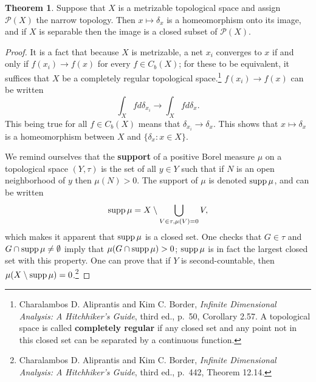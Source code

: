 \documentclass{article}
\newcommand{\supp}{\ensuremath\mathrm{supp}\,}
\theoremstyle{definition}
\newtheorem{theorem}{Theorem}
\theoremstyle{definition}
\begin{document}
\begin{theorem}
Suppose that $X$ is a metrizable topological space and assign $\mathscr{P}(X)$ the narrow topology.
Then $x \mapsto \delta_x$ is a homeomorphism onto its image, and if $X$ is separable then
the image is a closed subset of $\mathscr{P}(X)$.
\label{deltaembedding}
\end{theorem}
\begin{proof}
It is a fact that because $X$ is metrizable,
a net $x_i$ converges to $x$ if and only if $f(x_i) \to f(x)$ for every $f \in C_b(X)$; for these to be equivalent, it suffices that $X$ be a
completely
regular topological space.\footnote{Charalambos D. 
Aliprantis and Kim C. Border, {\em Infinite Dimensional Analysis: A Hitchhiker's Guide}, third ed., p.~50, Corollary 2.57. A topological space is called
\textbf{completely regular} if any closed set and any point not in this closed set can be separated by a continuous function.}
 $f(x_i) \to f(x)$ can be written
\[
\int_X f d\delta_{x_i} \to \int_X f d\delta_x.
\]
This being true for all $f \in C_b(X)$ means that $\delta_{x_i} \to \delta_x$. 
This shows that $x \mapsto \delta_x$ is a homeomorphism between $X$ and $\{\delta_x: x \in X\}$. 

We remind ourselves that the \textbf{support}  of a positive Borel measure $\mu$
on a topological space $(Y,\tau)$ is the set of all $y \in Y$ such that if $N$ is an open neighborhood
of $y$ then $\mu(N)>0$. The support of $\mu$ is denoted $\supp \mu$, and can be written
\[
\supp \mu = X\setminus  \bigcup_{V \in \tau, \mu(V) = 0} V,
\]
which makes it apparent that $\supp \mu$ is a closed set.
One checks that $G \in \tau$ and $G \cap \supp \mu \neq \emptyset$
imply that $\mu(G \cap \supp \mu)>0$; $\supp \mu$ is in fact the largest closed set with this property.
One can prove that if $Y$ is second-countable, then $\mu(X \setminus \supp \mu)=0$.\footnote{Charalambos D. 
Aliprantis and Kim C. Border, {\em Infinite Dimensional Analysis: A Hitchhiker's Guide}, third ed., p.~442, Theorem 12.14.}



\end{proof}
\end{document}
